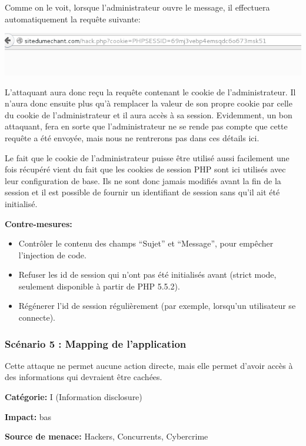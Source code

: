 \documentclass{article}
\begin{document}
Comme on le voit, lorsque l'administrateur ouvre le message, il
effectuera automatiquement la requête suivante:

\includegraphics{images/xss6.png}

L'attaquant aura donc reçu la requête contenant le cookie de
l'administrateur. Il n'aura donc ensuite plus qu'à remplacer la valeur
de son propre cookie par celle du cookie de l'administrateur et il aura
accès à sa session. Evidemment, un bon attaquant, fera en sorte que
l'administrateur ne se rende pas compte que cette requête a été envoyée,
mais nous ne rentrerons pas dans ces détails ici.

Le fait que le cookie de l'administrateur puisse être utilisé aussi
facilement une fois récupéré vient du fait que les cookies de session
PHP sont ici utilisés avec leur configuration de base. Ils ne sont donc
jamais modifiés avant la fin de la session et il est possible de fournir
un identifiant de session sans qu'il ait été initialisé.

\textbf{Contre-mesures:}

\begin{itemize}

\item
  Contrôler le contenu des champs ``Sujet'' et ``Message'', pour
  empêcher l'injection de code.
\item
  Refuser les id de session qui n'ont pas été initialisés avant (strict
  mode, seulement disponible à partir de PHP 5.5.2).
\item
  Régénerer l'id de session régulièrement (par exemple, lorsqu'un
  utilisateur se connecte).
\end{itemize}

\subsubsection{Scénario 5 : Mapping de l'application}

Cette attaque ne permet aucune action directe, mais elle permet d'avoir
accès à des informations qui devraient être cachées.

\textbf{Catégorie:} I (Information disclosure)

\textbf{Impact:} bas

\textbf{Source de menace:} Hackers, Concurrents, Cybercrime
\end{document}
